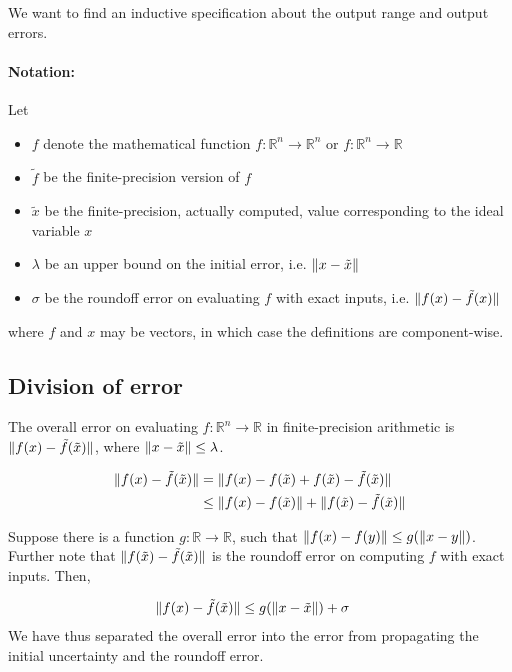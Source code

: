 \section{}
\label{theory-errors}
We want to find an inductive specification about the output range and output errors.



\paragraph{Notation:} Let
\begin{itemize}
\item $f$ denote the mathematical function $f: \mathbb{R}^n \to \mathbb{R}^n$ or $f: \mathbb{R}^n \to \mathbb{R}$
\item $\tilde{f}$ be the finite-precision version of $f$
\item $\tilde{x}$ be the finite-precision, actually computed, value corresponding to the
ideal variable $x$
\item $\lambda$ be an upper bound on the initial error, i.e. $\lVert x - \tilde{x} \rVert$
\item $\sigma$ be the roundoff error on evaluating $f$ with exact inputs, i.e.
  $\lVert f(x) - \tilde{f}(x) \rVert$
\end{itemize}
where $f$ and $x$ may be vectors, in which case the definitions are component-wise.

\subsection{Division of error}
The overall error on evaluating $f: \mathbb{R}^n \to \mathbb{R}$ in finite-precision arithmetic is
  $\lVert f(x) - \tilde{f}(\tilde{x}) \rVert$, where $\lVert x - \tilde{x} \rVert \le \lambda$.

\begin{align}
\lVert f(x) - \tilde{f}(\tilde{x}) \rVert &=
 \lVert f(x) - f(\tilde{x}) + f(\tilde{x}) - \tilde{f}(\tilde{x}) \rVert \\
 &\le \lVert f(x) - f(\tilde{x}) \rVert + \lVert f(\tilde{x}) - \tilde{f}(\tilde{x}) \rVert
\end{align}

Suppose there is a function $g: \mathbb{R} \to \mathbb{R}$, such that $\lVert f(x) - f(y) \rVert \le g(\lVert x - y \rVert)$.
Further note that $\lVert f(\tilde{x}) - \tilde{f}(\tilde{x}) \rVert$ is the roundoff error on
computing $f$ with exact inputs. Then,

\begin{align}
\label{errorLoopBody}
\lVert f(x) - \tilde{f}(\tilde{x}) \rVert &\le g(\lVert x - \tilde{x} \rVert) + \sigma
\end{align}
We have thus separated the overall error into the error from propagating
the initial uncertainty and the roundoff error.

